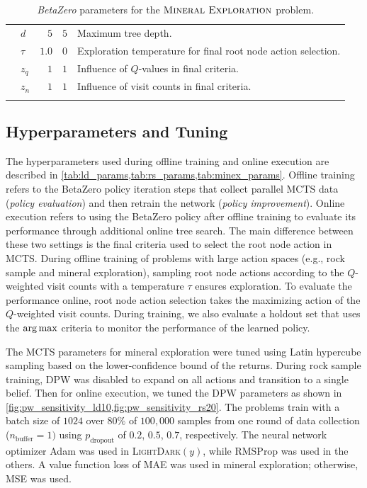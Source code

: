 \begin{table}[t!]
\begin{adjustbox}{max width=\textwidth}
\begin{threeparttable}
\begin{footnotesize}
\begin{tabular}{@{}clrrm{9cm}@{}}
              & $d$ & $\num{5}$ & $\num{5}$ & Maximum tree depth. \\
              & $\tau$ & $\num{1.0}$ & $\num{0}$ & Exploration temperature for final root node action selection. \\
              & $z_q$ & $\num{1}$ & $\num{1}$ & Influence of $Q$-values in final criteria. \\
              & $z_n$ & $\num{1}$ & $\num{1}$ & Influence of visit counts in final criteria. \\
            \arrayrulecolor{black} %
            \bottomrule
        \end{tabular}
        \end{footnotesize}
    \end{threeparttable}
    \end{adjustbox}
    \caption{\textit{BetaZero} parameters for the $\textsc{Mineral Exploration}$ problem.}\label{tab:minex_params}
\end{table}


\subsection{Hyperparameters and Tuning}

The hyperparameters used during offline training and online execution are described in \cref{tab:ld_params,tab:rs_params,tab:minex_params}.
Offline training refers to the BetaZero policy iteration steps that collect parallel MCTS data (\textit{policy evaluation}) and then retrain the network (\textit{policy improvement}).
Online execution refers to using the BetaZero policy after offline training to evaluate its performance through additional online tree search.
The main difference between these two settings is the final criteria used to select the root node action in MCTS.
During offline training of problems with large action spaces (e.g., rock sample and mineral exploration), sampling root node actions according to the $Q$-weighted visit counts with a temperature $\tau$ ensures exploration.
To evaluate the performance online, root node action selection takes the maximizing action of the $Q$-weighted visit counts.
During training, we also evaluate a holdout set that uses the $\argmax$ criteria to monitor the performance of the learned policy.


The MCTS parameters for mineral exploration were tuned using Latin hypercube sampling based on the lower-confidence bound of the returns.
During rock sample training, DPW was disabled to expand on all actions and transition to a single belief.
Then for online execution, we tuned the DPW parameters as shown in \cref{fig:pw_sensitivity_ld10,fig:pw_sensitivity_rs20}.
The problems train with a batch size of $1024$ over $80\%$ of $100{,}000$ samples from one round of data collection ($n_\text{buffer}=1)$ using $p_\text{dropout}$ of $0.2$, $0.5$, $0.7$, respectively.
The neural network optimizer Adam \cite{kingma2014adam} was used in \textsc{LightDark}$(y)$, while RMSProp \cite{hinton2014rmsprop} was used in the others.
A value function loss of MAE was used in mineral exploration; otherwise, MSE was used.


